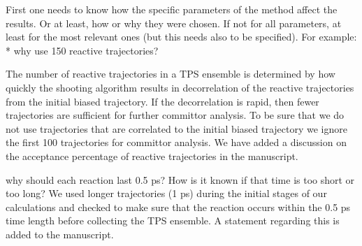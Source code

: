 \documentclass[journal=jpcbfk,manuscript=article,layout=traditional]{achemso}
\begin{document}
\begin{response}
{First one needs to know how the specific parameters of the method affect 
the results. Or at least, how or why they were chosen. If not for all parameters, 
at least for the most relevant ones (but this needs also to be specified). 
\newline
For example:
* why use 150 reactive trajectories?}

The number of reactive trajectories in a TPS ensemble is determined 
by how quickly the shooting algorithm results in decorrelation of 
the reactive trajectories from the initial biased trajectory. If the 
decorrelation is rapid, then fewer trajectories are sufficient for 
further committor analysis. To be sure that we do not use trajectories 
that are correlated to the initial biased trajectory we ignore the 
first 100 trajectories for committor analysis. We have added a discussion 
on the acceptance percentage of reactive trajectories in the manuscript. 

\end{response}

\begin{response}
  {why should each reaction last 0.5 ps? How is it known if that time is too short 
  or too long?}
We used longer trajectories (1 ps) during the initial stages of our calculations 
and checked to make sure that the reaction occurs within 
the 0.5 ps time length before collecting the TPS ensemble. A statement regarding this 
is added to the manuscript. 
\end{response}
\end{document}
